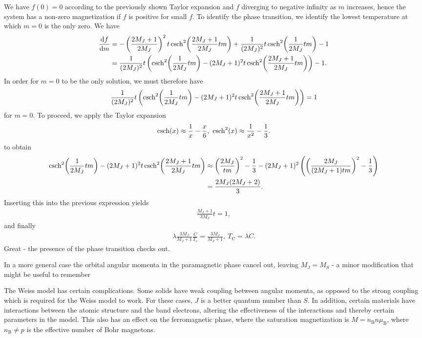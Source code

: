 We have $f(0) = 0$ according to the previously shown Taylor expansion and $f$ diverging to negative infinity as $m$ increases, hence the system has a non-zero magnetization if $f$ is positive for small $f$. To identify the phase transition, we identify the lowest temperature at which $m = 0$ is the only zero. We have
\begin{align*}
	\dv{f}{m} &= -\left(\frac{2M_{J} + 1}{2M_{J}}\right)^{2}t\csch[2](\frac{2M_{J} + 1}{2M_{J}}tm) + \frac{1}{(2M_{J})^{2}}t\csch[2](\frac{1}{2M_{J}}tm) - 1 \\
	          &= \frac{1}{(2M_{J})^{2}}t\left(\csch[2](\frac{1}{2M_{J}}tm) - (2M_{J} + 1)^{2}t\csch[2](\frac{2M_{J} + 1}{2M_{J}}tm)\right) - 1.
\end{align*}
In order for $m = 0$ to be the only solution, we must therefore have
\begin{align*}
	\frac{1}{(2M_{J})^{2}}t\left(\csch[2](\frac{1}{2M_{J}}tm) - (2M_{J} + 1)^{2}t\csch[2](\frac{2M_{J} + 1}{2M_{J}}tm)\right) = 1
\end{align*}
for $m = 0$. To proceed, we apply the Taylor expansion
\begin{align*}
	\csch(x) \approx \frac{1}{x} - \frac{x}{6},\ \csch[2](x) \approx \frac{1}{x^{2}} - \frac{1}{3}.
\end{align*}
to obtain
\begin{align*}
	\csch[2](\frac{1}{2M_{J}}tm) - (2M_{J} + 1)^{2}t\csch[2](\frac{2M_{J} + 1}{2M_{J}}tm) &\approx \left(\frac{2M_{J}}{tm}\right)^{2} - \frac{1}{3} - (2M_{J} + 1)^{2}\left(\left(\frac{2M_{J}}{(2M_{J} + 1)tm}\right)^{2} - \frac{1}{3}\right) \\
	&= \frac{2M_{J}(2M_{J} + 2)}{3}.
\end{align*}
Inserting this into the previous expression yields
\begin{align*}
	\frac{M_{J} + 1}{3M_{J}}t = 1,
\end{align*}
and finally
\begin{align*}
	\lambda\frac{3M_{J}}{M_{J} + 1}\frac{C}{T_{\text{c}}} = \frac{3M_{J}}{M_{J} + 1},\ T_{\text{C}} = \lambda C.
\end{align*}
Great - the presence of the phase transition checks out.

In a more general case the orbital angular momenta in the paramagnetic phase cancel out, leaving $M_{J} = M_{S}$ - a minor modification that might be useful to remember

The Weiss model has certain complications. Some solids have weak coupling between angular momenta, as opposed to the strong coupling which is required for the Weiss model to work. For these cases, $J$ is a better quantum number than $S$. In addition, certain materials have interactions between the atomic structure and the band electrons, altering the effectiveness of the interactions and thereby certain parameters in the model. This also has an effect on the ferromagnetic phase, where the saturation magnetization is $M = n_{\text{B}}n\mu_{\text{B}}$, where $n_{\text{B}} \neq p$ is the effective number of Bohr magnetons.

